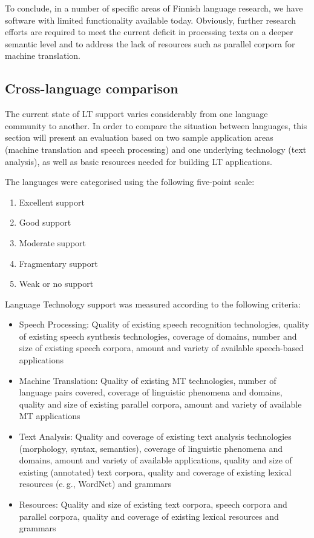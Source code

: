 \begin{multicols}{2}
To conclude, in a number of specific areas of Finnish language research, we
have software with limited functionality available today. Obviously, further
research efforts are required to meet the current deficit in processing texts
on a deeper semantic level and to address the lack of resources such as
parallel corpora for machine translation.

\subsection{Cross-language comparison}

The current state of LT support varies considerably from one language
community to another. In order to compare the situation between
languages, this section will present an evaluation based on two sample
application areas (machine translation and speech processing) and one
underlying technology (text analysis), as well as basic resources
needed for building LT applications.

The languages were categorised using the following five-point scale: 

\begin{enumerate}
\item Excellent support
\item Good support
\item Moderate support
\item Fragmentary support
\item Weak or no support
\end{enumerate}

Language Technology support was measured according to the following criteria:
\begin{itemize}
\item Speech Processing: Quality of existing speech recognition
       technologies, quality of existing speech synthesis
       technologies, coverage of domains, number and size of existing
       speech corpora, amount and variety of available speech-based
       applications
\item Machine Translation: Quality of existing MT technologies, number
       of language pairs covered, coverage of linguistic phenomena and
       domains, quality and size of existing parallel corpora, amount
       and variety of available MT applications

\item Text Analysis: Quality and coverage of existing text analysis
       technologies (morphology, syntax, semantics), coverage of
       linguistic phenomena and domains, amount and variety of
       available applications, quality and size of existing
       (annotated) text corpora, quality and coverage of existing
       lexical resources (e.\,g., WordNet) and grammars
\item Resources: Quality and size of existing text corpora, speech
       corpora and parallel corpora, quality and coverage of existing
       lexical resources and grammars
\end{itemize}


\end{multicols}
